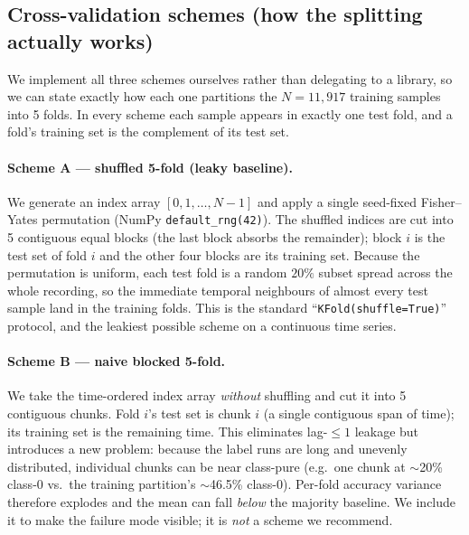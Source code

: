 \documentclass[11pt]{article}
\begin{document}
\subsection{Cross-validation schemes (how the splitting actually works)}

We implement all three schemes ourselves rather than delegating to a
library, so we can state exactly how each one partitions the
$N = 11{,}917$ training samples into 5 folds. In every scheme each sample
appears in exactly one test fold, and a fold's training set is the
complement of its test set.

\paragraph{Scheme A --- shuffled 5-fold (leaky baseline).}
We generate an index array $[0,1,\dots,N-1]$ and apply a single
seed-fixed Fisher--Yates permutation (NumPy \texttt{default\_rng(42)}).
The shuffled indices are cut into 5 contiguous equal blocks (the last
block absorbs the remainder); block $i$ is the test set of fold $i$ and the
other four blocks are its training set. Because the permutation is uniform,
each test fold is a random $20\%$ subset spread across the whole
recording, so the immediate temporal neighbours of almost every test
sample land in the training folds. This is the standard
``\texttt{KFold(shuffle=True)}'' protocol, and the leakiest possible scheme
on a continuous time series.

\paragraph{Scheme B --- naive blocked 5-fold.}
We take the time-ordered index array \emph{without} shuffling and cut it
into 5 contiguous chunks. Fold $i$'s test set is chunk $i$ (a single
contiguous span of time); its training set is the remaining time. This
eliminates lag-$\le 1$ leakage but introduces a new problem: because the
label runs are long and unevenly distributed, individual chunks can be
near class-pure (e.g.\ one chunk at $\sim$20\% class-0 vs.\ the training
partition's $\sim$46.5\% class-0). Per-fold accuracy variance therefore explodes and the mean can
fall \emph{below} the majority baseline. We include it to make the failure
mode visible; it is \emph{not} a scheme we recommend.
\end{document}
